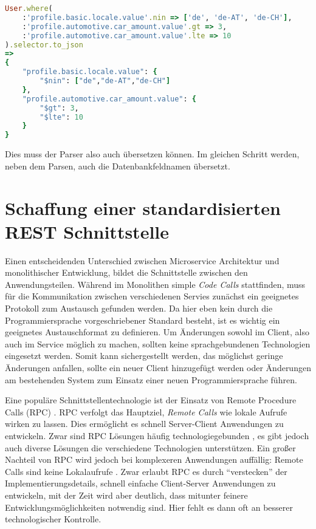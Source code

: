 \begin{lstlisting}[language=Ruby]
User.where(
    :'profile.basic.locale.value'.nin => ['de', 'de-AT', 'de-CH'],
    :'profile.automotive.car_amount.value'.gt => 3,
    :'profile.automotive.car_amount.value'.lte => 10
).selector.to_json
=> 
{
    "profile.basic.locale.value": {
        "$nin": ["de","de-AT","de-CH"]
    },
    "profile.automotive.car_amount.value": {
        "$gt": 3,
        "$lte": 10
    }
}
\end{lstlisting}

\noindent Dies muss der Parser also auch übersetzen können. Im gleichen Schritt werden, neben dem Parsen, auch die Datenbankfeldnamen übersetzt.

\section{Schaffung einer standardisierten REST Schnittstelle}
Einen entscheidenden Unterschied zwischen Microservice Architektur und monolithischer Entwicklung, bildet die Schnittstelle zwischen den Anwendungsteilen. Während im Monolithen simple \textit{Code Calls} stattfinden, muss für die Kommunikation zwischen verschiedenen Servies zunächst ein geeignetes Protokoll zum Austausch gefunden werden.
Da hier eben kein durch die Programmiersprache vorgeschriebener Standard besteht, ist es wichtig ein geeignetes Austauschformat zu definieren.
Um Änderungen sowohl im Client, also auch im Service möglich zu machen, sollten keine sprachgebundenen Technologien eingesetzt werden. Somit kann sichergestellt werden, das möglichst geringe Änderungen anfallen, sollte ein neuer Client hinzugefügt werden oder Änderungen am bestehenden System zum Einsatz einer neuen Programmiersprache führen.

Eine populäre Schnittstellentechnologie ist der Einsatz von Remote Procedure Calls (RPC) \cite{rpc}. RPC verfolgt das Hauptziel, \textit{Remote Calls} wie lokale Aufrufe wirken zu lassen. Dies ermöglicht es schnell Server-Client Anwendungen zu entwickeln. Zwar sind RPC Lösungen häufig technologiegebunden \cite[vgl.][Seite 46]{newman2015building}, es gibt jedoch auch diverse Lösungen die verschiedene Technologien unterstützen. Ein großer Nachteil von RPC wird jedoch bei komplexeren Anwendungen auffällig: Remote Calls sind keine Lokalaufrufe \cite[][Seite 47]{newman2015building}. Zwar erlaubt RPC es durch ``verstecken'' der Implementierungsdetails, schnell einfache Client-Server Anwendungen zu entwickeln, mit der Zeit wird aber deutlich, dass mitunter feinere Entwicklungsmöglichkeiten notwendig sind. Hier fehlt es dann oft an besserer technologischer Kontrolle.

